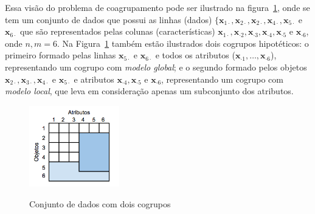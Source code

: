 \documentclass[
    12pt,                %
    oneside,            %
    a4paper,            %
    english,            %
    brazil                %
    ]{abntex2ppgsi}
\begin{document}
Essa visão do problema de coagrupamento pode ser ilustrado na figura~\ref{fig:bicluster-exp}, onde se tem um conjunto de dados que possui as linhas (dados) $\{\mathbf{x}_{1 \cdot}, \mathbf{x}_{2 \cdot}, \mathbf{x}_{2 \cdot}, \mathbf{x}_{4 \cdot}, \mathbf{x}_{5 \cdot}$ e $\mathbf{x}_{6 \cdot}$ que são representados pelas colunas (características) $\mathbf{x}_{1 \cdot}, \mathbf{x}_{\cdot 2}, \mathbf{x}_{\cdot 3}, \mathbf{x}_{\cdot 4}, \mathbf{x}_{\cdot 5}$ e $\mathbf{x}_{\cdot 6}$, onde $n,m = 6$.
Na Figura~\ref{fig:bicluster-exp} também estão ilustrados dois cogrupos hipotéticos: o primeiro formado pelas linhas $\mathbf{x}_{5 \cdot}$ e $\mathbf{x}_{6 \cdot}$ e todos os atributos ($\mathbf{x}_{\cdot 1}, \dots, \mathbf{x}_{\cdot 6}$), representando um cogrupo com \textit{modelo global}; e o segundo formado pelos objetos $\mathbf{x}_{2 \cdot}, \mathbf{x}_{3 \cdot}, \mathbf{x}_{4 \cdot}$ e $\mathbf{x}_{5 \cdot}$ e atributos $\mathbf{x}_{\cdot 4}, \mathbf{x}_{\cdot 5}$ e $\mathbf{x}_{\cdot 6}$, representando um cogrupo com \textit{modelo local}, que leva em consideração apenas um subconjunto dos atributos.

\begin{figure}[H]
\centering
    \caption{Conjunto de dados com dois cogrupos}
    \includegraphics[width=0.35\textwidth]{img/bicluster.png}
    \label{fig:bicluster-exp}
\end{figure}

\end{document}
